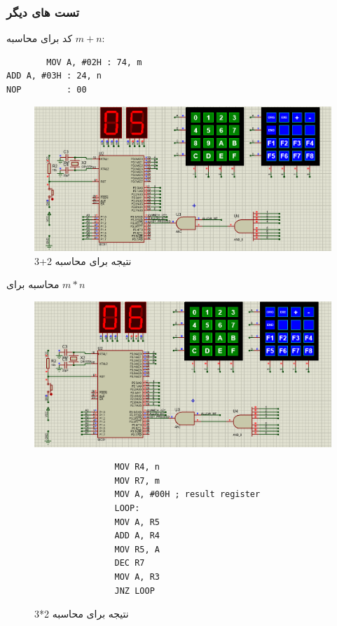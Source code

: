 \documentclass[11pt]{article}
\begin{document}
\subsubsection{تست های دیگر}

کد برای محاسبه $m+n$:
\begin{latin}
	\begin{verbatim}
		MOV A, #02H : 74, m
ADD A, #03H : 24, n
NOP         : 00
	\end{verbatim}
\end{latin}

\begin{figure}[h]
	\centering
	\includegraphics*[width=0.45\linewidth]{result/calculation 2+3.png}
	\caption{نتیجه برای محاسبه 2+3}
\end{figure}

محاسبه برای $m*n$
\begin{figure}[h]
	\centering
	\begin{minipage}[r]{0.5\linewidth}
		\centering
		\includegraphics*[width=\linewidth]{result/calculation 2x3.png}
	\end{minipage}
	\begin{minipage}[l]{0.4\linewidth}
		\begin{latin}
			\begin{verbatim}
				MOV R4, n
				MOV R7, m
				MOV A, #00H ; result register
				LOOP:
				MOV A, R5
				ADD A, R4
				MOV R5, A
				DEC R7
				MOV A, R3
				JNZ LOOP
			\end{verbatim}
		\end{latin}
	\end{minipage}
	\caption{نتیجه برای محاسبه 2*3}
\end{figure}
\end{document}
